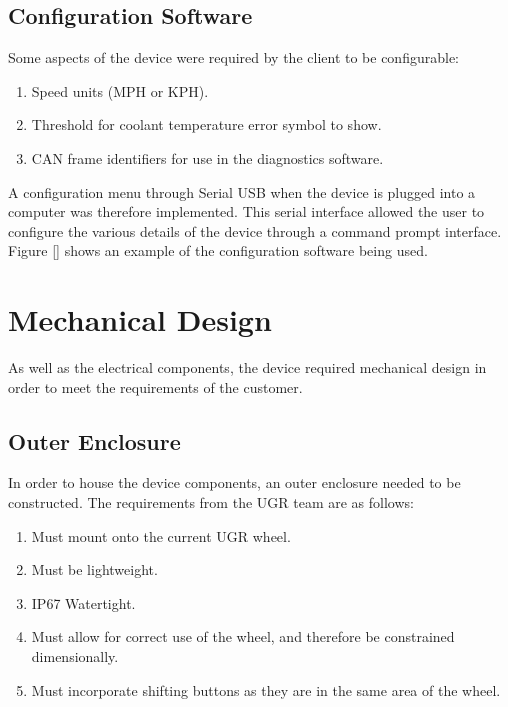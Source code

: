 \documentclass[a4paper,12pt]{article}
\begin{document}
\subsection{Configuration Software}
\label{sec:configuration_software}

Some aspects of the device were required by the client to be configurable:

\begin{enumerate}
  \item Speed units (MPH or KPH).
  \item Threshold for coolant temperature error symbol to show.
  \item CAN frame identifiers for use in the diagnostics software.
\end{enumerate}
\vspace{1cm}

A configuration menu through Serial USB when the device is plugged into a computer was therefore implemented. This serial interface allowed the user to configure the various details of the device through a command prompt interface. Figure \ref{} shows an example of the configuration software being used.


\newpage
\section{Mechanical Design}
\label{sec:mechanical_design}

As well as the electrical components, the device required mechanical design in order to meet the requirements of the customer.

\subsection{Outer Enclosure}
\label{sec:outer_enclosure}

In order to house the device components, an outer enclosure needed to be constructed. The requirements from the UGR team are as follows:

\begin{enumerate}
  \item Must mount onto the current UGR wheel.
  \item Must be lightweight.
  \item IP67 Watertight.
  \item Must allow for correct use of the wheel, and therefore be constrained dimensionally.
  \item Must incorporate shifting buttons as they are in the same area of the wheel.
\end{enumerate}
\vspace{1cm}
\end{document}
